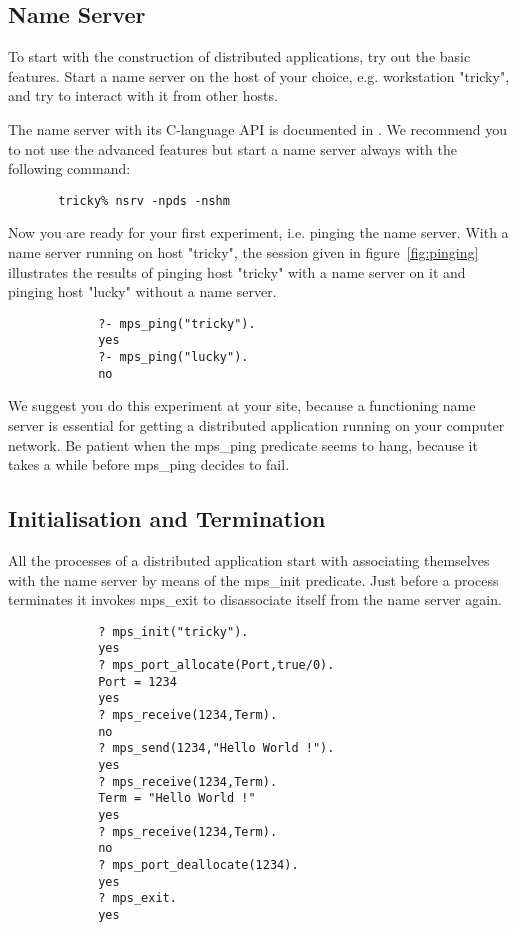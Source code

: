 \subsection{Name Server}

To start with the construction of distributed \eclipse applications,
try out the basic features. Start a name server on the host of your
choice, e.g. workstation "tricky", and try to interact with it from 
other hosts.

The name server with its C-language API is documented in \cite{nsrvref}. 
We recommend you to not use the advanced features but start a name server 
always with the following command:

\begin{verbatim}
       tricky% nsrv -npds -nshm
\end{verbatim}

Now you are ready for your first experiment, i.e. pinging the name server.
With a name server running on host "tricky", the \eclipse session given 
in figure~\ref{fig:pinging} illustrates the results of pinging host
"tricky" with a name server on it and pinging host "lucky" without a
name server.

\begin{figure}[hbt]
\begin{verbatim}
       ?- mps_ping("tricky"). 
       yes
       ?- mps_ping("lucky"). 
       no
\end{verbatim}
\center{
\caption{\label{fig:pinging} {Pinging the Name Server}}}
\end{figure} 

We suggest you do this experiment at your site, because a functioning
name server is essential for getting a distributed \eclipse application
running on your computer network. Be patient when the mps\_ping predicate
seems to hang, because it takes a while before mps\_ping decides to fail.


\subsection{Initialisation and Termination}

All the processes of a distributed application start with associating 
themselves with the name server by means of the mps\_init predicate.
Just before a process terminates it invokes mps\_exit to disassociate
itself from the name server again.

\begin{figure}[hbt]
\begin{verbatim}
       ? mps_init("tricky"). 
       yes
       ? mps_port_allocate(Port,true/0).
       Port = 1234
       yes
       ? mps_receive(1234,Term).
       no
       ? mps_send(1234,"Hello World !").
       yes
       ? mps_receive(1234,Term).
       Term = "Hello World !" 
       yes
       ? mps_receive(1234,Term).
       no
       ? mps_port_deallocate(1234).
       yes
       ? mps_exit. 
       yes
\end{verbatim}
\center{
\caption{\label{fig:local} {Local Communication}}}
\end{figure} 

